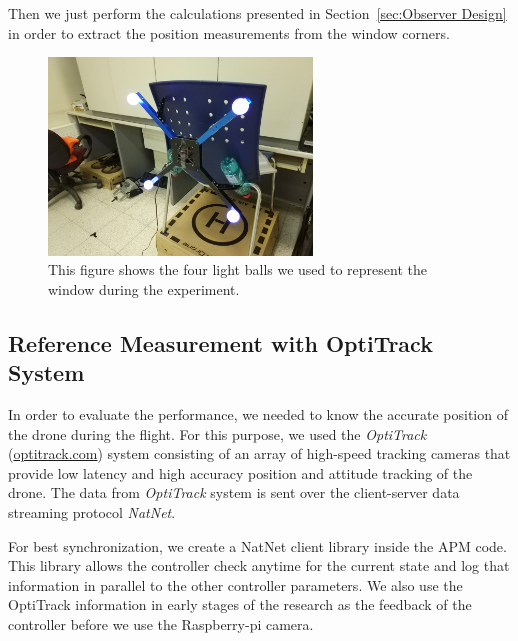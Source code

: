 \documentclass[ twoside, 12pt ]{article}
\begin{document}
Then we just perform the calculations presented in Section~\ref{sec:Observer Design} in order to extract the position measurements from the window corners.

\begin{figure} %
    \centerline{\includegraphics[width=70mm]{window_lights.jpg}}
    \caption{This figure shows the four light balls we used to represent the window during the experiment.}
    \label{fig:window_lights}
\end{figure}

\subsection{Reference Measurement with OptiTrack System}
\label{sec:Experiment setup-optitrack}
In order to evaluate the performance, we needed to know the accurate position of the drone during the flight. For this purpose, we used the \textit{OptiTrack} (\url{optitrack.com}) system 
consisting of an array of high-speed tracking cameras that provide low latency and high accuracy position and attitude tracking of the drone. The data from \textit{OptiTrack} system is sent over the client-server data streaming protocol \textit{NatNet}.

For best synchronization, we create a NatNet client library inside the APM code. This library allows the controller check anytime for the current state and log that information in parallel to the other controller parameters.
We also use the OptiTrack information in early stages of the research as the feedback of the controller before we use the Raspberry-pi camera.
\end{document}
